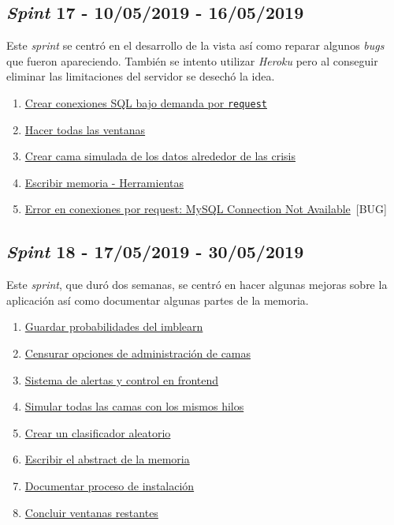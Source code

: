 \subsection{\textit{Spint} 17 - 10/05/2019 - 16/05/2019}
Este \textit{sprint} se centró en el desarrollo de la vista así como reparar algunos \textit{bugs} que fueron apareciendo. También se intento utilizar \textit{Heroku} pero al conseguir eliminar las limitaciones del servidor se desechó la idea.

\begin{enumerate}\addtocounter{enumi}{79}
	\item 
	\href{https://github.com/jlgarridol/TFG-SmartBeds/issues/80}{Crear conexiones SQL bajo demanda por \texttt{request}}
	\item 
	\href{https://github.com/jlgarridol/TFG-SmartBeds/issues/81}{Hacer todas las ventanas}
	\item 
	\href{https://github.com/jlgarridol/TFG-SmartBeds/issues/82}{Crear cama simulada de los datos alrededor de las crisis}
	\item 
	\href{https://github.com/jlgarridol/TFG-SmartBeds/issues/83}{Escribir memoria - Herramientas}
	\item 
	\href{https://github.com/jlgarridol/TFG-SmartBeds/issues/84}{Error en conexiones por request: MySQL Connection Not Available}~[BUG]
\end{enumerate}

\subsection{\textit{Spint} 18 - 17/05/2019 - 30/05/2019}
Este \textit{sprint}, que duró dos semanas, se centró en hacer algunas mejoras sobre la aplicación así como documentar algunas partes de la memoria.

\begin{enumerate}\addtocounter{enumi}{84}
	\item 
	\href{https://github.com/jlgarridol/TFG-SmartBeds/issues/85}{Guardar probabilidades del imblearn}
	\item 
	\href{https://github.com/jlgarridol/TFG-SmartBeds/issues/86}{Censurar opciones de administración de camas}
	\item 
	\href{https://github.com/jlgarridol/TFG-SmartBeds/issues/87}{Sistema de alertas y control en frontend}
	\item 
	\href{https://github.com/jlgarridol/TFG-SmartBeds/issues/88}{Simular todas las camas con los mismos hilos}
	\item 
	\href{https://github.com/jlgarridol/TFG-SmartBeds/issues/89}{Crear un clasificador aleatorio}
	\item 
	\href{https://github.com/jlgarridol/TFG-SmartBeds/issues/90}{Escribir el abstract de la memoria}
	\item 
	\href{https://github.com/jlgarridol/TFG-SmartBeds/issues/91}{Documentar proceso de instalación}
	\item 
	\href{https://github.com/jlgarridol/TFG-SmartBeds/issues/92}{Concluir ventanas restantes}
\end{enumerate}

